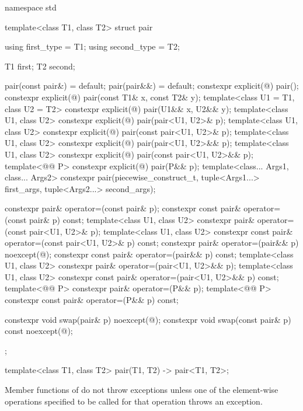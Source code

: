 %
\begin{codeblock}
namespace std {
  template<class T1, class T2>
  struct pair {
    using first_type  = T1;
    using second_type = T2;

    T1 first;
    T2 second;

    pair(const pair&) = default;
    pair(pair&&) = default;
    constexpr explicit(@\seebelow@) pair();
    constexpr explicit(@\seebelow@) pair(const T1& x, const T2& y);
    template<class U1 = T1, class U2 = T2>
      constexpr explicit(@\seebelow@) pair(U1&& x, U2&& y);
    template<class U1, class U2>
      constexpr explicit(@\seebelow@) pair(pair<U1, U2>& p);
    template<class U1, class U2>
      constexpr explicit(@\seebelow@) pair(const pair<U1, U2>& p);
    template<class U1, class U2>
      constexpr explicit(@\seebelow@) pair(pair<U1, U2>&& p);
    template<class U1, class U2>
      constexpr explicit(@\seebelow@) pair(const pair<U1, U2>&& p);
    template<@@ P>
      constexpr explicit(@\seebelow@) pair(P&& p);
    template<class... Args1, class... Args2>
      constexpr pair(piecewise_construct_t,
                     tuple<Args1...> first_args, tuple<Args2...> second_args);

    constexpr pair& operator=(const pair& p);
    constexpr const pair& operator=(const pair& p) const;
    template<class U1, class U2>
      constexpr pair& operator=(const pair<U1, U2>& p);
    template<class U1, class U2>
      constexpr const pair& operator=(const pair<U1, U2>& p) const;
    constexpr pair& operator=(pair&& p) noexcept(@\seebelow@);
    constexpr const pair& operator=(pair&& p) const;
    template<class U1, class U2>
      constexpr pair& operator=(pair<U1, U2>&& p);
    template<class U1, class U2>
      constexpr const pair& operator=(pair<U1, U2>&& p) const;
    template<@@ P>
      constexpr pair& operator=(P&& p);
    template<@@ P>
      constexpr const pair& operator=(P&& p) const;

    constexpr void swap(pair& p) noexcept(@\seebelow@);
    constexpr void swap(const pair& p) const noexcept(@\seebelow@);
  };

  template<class T1, class T2>
    pair(T1, T2) -> pair<T1, T2>;
}
\end{codeblock}

\pnum
Member functions of  do not throw exceptions unless one of
the element-wise operations specified to be called for that operation
throws an exception.

